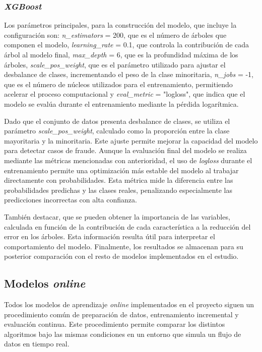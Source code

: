 \documentclass[12pt,a4paper]{report}
\begin{document}
\subsubsection{\emph{XGBoost}}

Los parámetros principales, para la construcción del modelo, que incluye la configuración son: \emph{n\_estimators} = 200, que es el número de árboles que componen el modelo, \emph{learning\_rate} = 0.1, que controla la contribución de cada árbol al modelo final, \emph{max\_depth} = 6, que es la profundidad máxima de los árboles, \emph{scale\_pos\_weight}, que es el parámetro utilizado para ajustar el desbalance de clases, incrementando el peso de la clase minoritaria, \emph{n\_jobs} = -1, que es el número de núcleos utilizados para el entrenamiento, permitiendo acelerar el proceso computacional y \emph{eval\_metric} = "logloss", que indica que el modelo se evalúa durante el entrenamiento mediante la pérdida logarítmica.

Dado que el conjunto de datos presenta desbalance de clases, se utiliza el parámetro \emph{scale\_pos\_weight}, calculado como la proporción entre la clase mayoritaria y la minoritaria. Este ajuste permite mejorar la capacidad del modelo para detectar casos de fraude. Aunque la evaluación final del modelo se realiza mediante las métricas mencionadas con anterioridad, el uso de \emph{logloss} durante el entrenamiento permite una optimización más estable del modelo al trabajar directamente con probabilidades. Esta métrica mide la diferencia entre las probabilidades predichas y las clases reales, penalizando especialmente las predicciones incorrectas con alta confianza.

También destacar, que se pueden obtener la importancia de las variables, calculada en función de la contribución de cada característica a la reducción del error en los árboles. Esta información resulta útil para interpretar el comportamiento del modelo. Finalmente, los resultados se almacenan para su posterior comparación con el resto de modelos implementados en el estudio.


\subsection{Modelos \emph{online}}

Todos los modelos de aprendizaje \emph{online} implementados en el proyecto siguen un procedimiento común de preparación de datos, entrenamiento incremental y evaluación continua. Este procedimiento permite comparar los distintos algoritmos bajo las mismas condiciones en un entorno que simula un flujo de datos en tiempo real.
\end{document}
